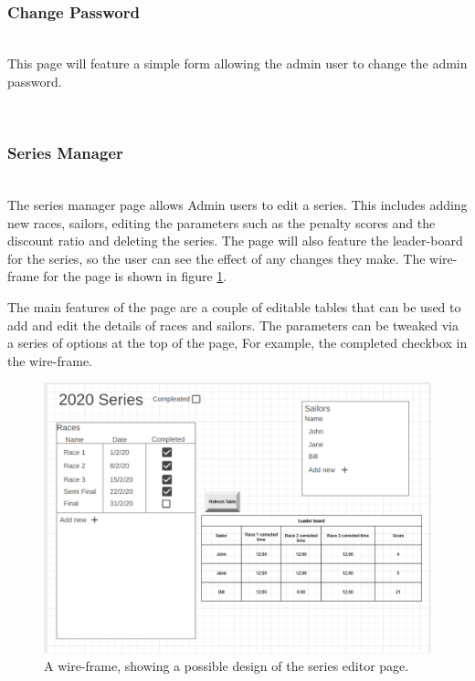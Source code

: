\documentclass{l4proj}
\begin{document}
\hfill\\
\subsubsection{Change Password}
\hfill\\
This page will feature a simple form allowing the admin user to change the admin password.

\hfill\\
\subsubsection{Series Manager}
\hfill\\
The series manager page allows Admin users to edit a series. This includes adding new races, sailors, editing the parameters such as the penalty scores and the discount ratio and deleting the series. The page will also feature the leader-board for the series, so the user can see the effect of any changes they make. The wire-frame for the page is shown in figure \ref{fig:seriesEditorWF}.

The main features of the page are a couple of editable tables that can be used to add and edit the details of races and sailors. The parameters can be tweaked via a series of options at the top of the page, For example, the completed checkbox in the wire-frame.

\begin{figure}[h!]
    \centering
    \includegraphics[width=1\linewidth]{images/Series editor 2.png} 

    \caption{A wire-frame, showing a possible design of the series editor page.
    }

    \label{fig:seriesEditorWF}
\end{figure}
\end{document}
